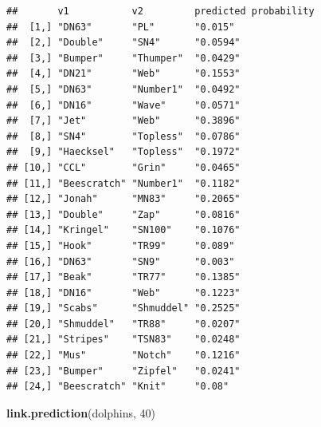 \documentclass[]{article}
\newenvironment{Shaded}{\begin{snugshade}}{\end{snugshade}}
\newcommand{\KeywordTok}[1]{\textcolor[rgb]{0.13,0.29,0.53}{\textbf{{#1}}}}
\newcommand{\DecValTok}[1]{\textcolor[rgb]{0.00,0.00,0.81}{{#1}}}
\newcommand{\NormalTok}[1]{{#1}}
\begin{document}
\begin{verbatim}
##       v1           v2         predicted probability
##  [1,] "DN63"       "PL"       "0.015"              
##  [2,] "Double"     "SN4"      "0.0594"             
##  [3,] "Bumper"     "Thumper"  "0.0429"             
##  [4,] "DN21"       "Web"      "0.1553"             
##  [5,] "DN63"       "Number1"  "0.0492"             
##  [6,] "DN16"       "Wave"     "0.0571"             
##  [7,] "Jet"        "Web"      "0.3896"             
##  [8,] "SN4"        "Topless"  "0.0786"             
##  [9,] "Haecksel"   "Topless"  "0.1972"             
## [10,] "CCL"        "Grin"     "0.0465"             
## [11,] "Beescratch" "Number1"  "0.1182"             
## [12,] "Jonah"      "MN83"     "0.2065"             
## [13,] "Double"     "Zap"      "0.0816"             
## [14,] "Kringel"    "SN100"    "0.1076"             
## [15,] "Hook"       "TR99"     "0.089"              
## [16,] "DN63"       "SN9"      "0.003"              
## [17,] "Beak"       "TR77"     "0.1385"             
## [18,] "DN16"       "Web"      "0.1223"             
## [19,] "Scabs"      "Shmuddel" "0.2525"             
## [20,] "Shmuddel"   "TR88"     "0.0207"             
## [21,] "Stripes"    "TSN83"    "0.0248"             
## [22,] "Mus"        "Notch"    "0.1216"             
## [23,] "Bumper"     "Zipfel"   "0.0241"             
## [24,] "Beescratch" "Knit"     "0.08"
\end{verbatim}

\begin{Shaded}
\begin{Highlighting}[]
\KeywordTok{link.prediction}\NormalTok{(dolphins, }\DecValTok{40}\NormalTok{)}
\end{Highlighting}
\end{Shaded}
\end{document}

